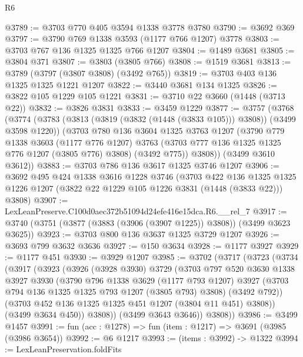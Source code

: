 \begin{lexlean}{R6}
\begin{coremodule}
@3789 := @3703 @770 @405 @3594 @1338 @3778 @3780
@3790 := @3692 @369
@3797 := @3790 @769 @1338 @3593 (@1177 @766 @1207) @3778
@3803 := @3703 @767 @136 @1325 @1325 @766 @1207
@3804 := @1489 @3681
@3805 := @3804 @371
@3807 := @3803 (@3805 @766)
@3808 := @1519 @3681
@3813 := @3789 (@3797 (@3807 @3808) (@3492 @765))
@3819 := @3703 @403 @136 @1325 @1325 @1221 @1207
@3822 := @3440 @3681 @134 @1325
@3826 := @3822 @105 @1229 @105 @1221
@3831 := @3710 @22 @3660 (@1448 (@3713 @22))
@3832 := @3826 @3831
@3833 := @3459 @1229
@3877 := @3757
    (@3768
      (@3774
        (@3783 (@3813 (@3819 (@3832 (@1448 (@3833 @105))) @3808)) (@3499 @3598 @1220))
        (@3703
          @780
          @136
          @3604
          @1325
          @3763
          @1207
          (@3790
            @779
            @1338
            @3603
            (@1177 @776 @1207)
            @3763
            (@3703 @777 @136 @1325 @1325 @776 @1207 (@3805 @776) @3808)
            (@3492 @775))
          @3808))
      (@3499 @3610 @3612))
@3883 := @3703 @786 @136 @3617 @1325 @3746 @1207
@3906 := @3692
    @495
    @424
    @1338
    @3616
    @1228
    @3746
    (@3703
      @422
      @136
      @1325
      @1325
      @1226
      @1207
      (@3822 @22 @1229 @105 @1226 @3831 (@1448 (@3833 @22)))
      @3808)
@3907 := LexLeanPreserve.C100d0aec372b51094d24efe416e15dca.R6.__rel_7
@3917 := @3740 (@3751 (@3877 (@3883 (@3906 (@3907 @1225)) @3808)) (@3499 @3623 @3625))
@3923 := @3703 @800 @136 @3637 @1325 @3729 @1207
@3926 := @3693 @799 @3632 @3636
@3927 := @150 @3634
@3928 := @1177 @3927
@3929 := @1177 @451
@3930 := @3929 @1207
@3985 := @3702
    (@3717
      (@3723
        (@3734
          (@3917
            (@3923
              (@3926
                (@3928 @3930)
                @3729
                (@3703
                  @797
                  @520
                  @3630
                  @1338
                  @3927
                  @3930
                  (@3790
                    @796
                    @1338
                    @3629
                    (@1177 @793 @1207)
                    @3927
                    (@3703 @794 @136 @1325 @1325 @793 @1207 (@3805 @793) @3808)
                    (@3492 @792))
                  (@3703 @452 @136 @1325 @1325 @451 @1207 (@3804 @11 @451) @3808))
                (@3499 @3634 @450))
              @3808))
          (@3499 @3643 @3646))
        @3808))
@3986 := @3499 @1457
@3991 := fun (acc : @1278) => fun (item : @1217) => @3691 (@3985 (@3986 @3654))
@3992 := @6 @1217
@3993 := (items : @3992) -> @1322
@3994 := LexLeanPreservation.foldFits

\end{coremodule}
\end{lexlean}
